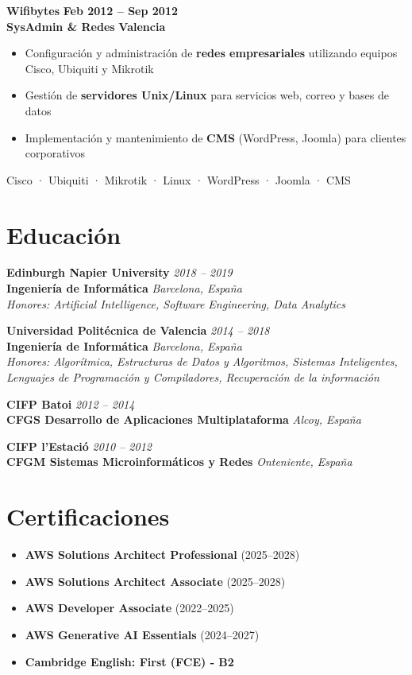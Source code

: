 \documentclass[11pt,a4paper]{article}
\newcommand{\experience}[4]{
    \vspace{0.2em}
    \textbf{\large\color{company}#1} \hfill \textbf{\color{burgundy}#2}\\
    \textbf{\color{role}#3} \hfill \textbf{\color{burgundy}#4}\\
    \vspace{0.1em}
}
\newcommand{\education}[5]{
    \textbf{\large\color{primary}#1} \hfill \textit{#2}\\
    \textbf{\color{secondary}#3} \hfill \textit{#4}\\
    \textit{\color{accent}#5}
}
\newcommand{\badges}[1]{
    \vspace{0.1em}
    \begin{center}
        \small\color{accent}#1
    \end{center}
    \vspace{0.1em}
}
\newcommand{\achievement}[1]{
    \item #1
}
\begin{document}
\vspace{0.3em}
\experience{Wifibytes}{Feb 2012 -- Sep 2012}{SysAdmin \& Redes}{Valencia}
\vspace{0.1em}
\begin{itemize}[leftmargin=1em, itemsep=0.2em]
    \achievement{Configuración y administración de \textbf{redes empresariales} utilizando equipos Cisco, Ubiquiti y Mikrotik}
    \achievement{Gestión de \textbf{servidores Unix/Linux} para servicios web, correo y bases de datos}
    \achievement{Implementación y mantenimiento de \textbf{CMS} (WordPress, Joomla) para clientes corporativos}
\end{itemize}
\badges{Cisco · Ubiquiti · Mikrotik · Linux · WordPress · Joomla · CMS}

\section{Educación}

\education{Edinburgh Napier University}{2018 -- 2019}{Ingeniería de Informática}{Barcelona, España}{Honores: Artificial Intelligence, Software Engineering, Data Analytics}

\education{Universidad Politécnica de Valencia}{2014 -- 2018}{Ingeniería de Informática}{Barcelona, España}{Honores: Algorítmica, Estructuras de Datos y Algoritmos, Sistemas Inteligentes, Lenguajes de Programación y Compiladores, Recuperación de la información}

\education{CIFP Batoi}{2012 -- 2014}{CFGS Desarrollo de Aplicaciones Multiplataforma}{Alcoy, España}{}

\education{CIFP l'Estació}{2010 -- 2012}{CFGM Sistemas Microinformáticos y Redes}{Onteniente, España}{}

\section{Certificaciones}

\begin{itemize}[leftmargin=1em, itemsep=0.3em]
    \item \textbf{AWS Solutions Architect Professional} (2025--2028)
    \item \textbf{AWS Solutions Architect Associate} (2025--2028)
    \item \textbf{AWS Developer Associate} (2022--2025)
    \item \textbf{AWS Generative AI Essentials} (2024--2027)
    \item \textbf{Cambridge English: First (FCE) - B2}
\end{itemize}
\end{document}
